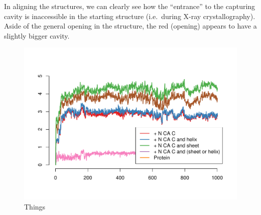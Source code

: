 \documentclass[10pt]{article}\usepackage[]{graphicx}\usepackage[]{color}
\makeatletter
\def\maxwidth{ %
  \ifdim\Gin@nat@width>\linewidth
    \linewidth
  \else
    \Gin@nat@width
  \fi
}
\theoremstyle{plain}
\makeatother
\begin{document}
\begin{multicols*}{2}
	In aligning the structures, we can clearly see how the “entrance” to the
	capturing cavity is inaccessible in the starting structure (i.e.\ during X-ray
	crystallography). Aside of the general opening in the structure, the red
	(opening) appears to have a slightly bigger cavity. 
	
\begin{Schunk}
\begin{figure}[H]

{\centering \includegraphics[width=\maxwidth]{figure/twocolumn-trajs-1} 

}

\caption[Things]{Things}\label{fig:trajs}
\end{figure}
\end{Schunk}
\end{multicols*}
\end{document}
